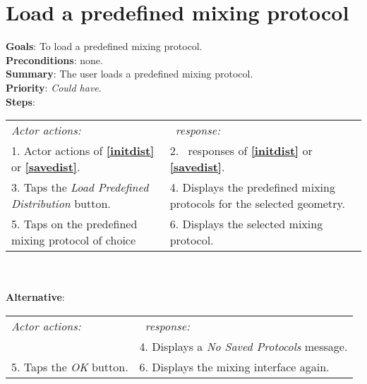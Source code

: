   \section{Load a predefined mixing protocol}
  \label{loadpredprot}
  \textbf{Goals}: To load a predefined mixing protocol.\\
  \textbf{Preconditions}: none.\\
  \textbf{Summary}: The user loads a predefined mixing protocol.\\
  \textbf{Priority}: \emph{Could have}.\\
  \textbf{Steps}: \\
  \begin{tabular}{ p{} p{} }
  	\emph{Actor actions:} & \emph{\projectname\ response:} \\
  	1. Actor actions of \textbf{\ref{initdist}} or  \textbf{\ref{savedist}}. & 2. \projectname\ responses of \textbf{\ref{initdist}} or  \textbf{\ref{savedist}}. \\
	3. Taps the \emph{Load Predefined Distribution} button. & 4. Displays the predefined mixing protocols for the selected geometry. \\
	5. Taps on the predefined mixing protocol of choice & 6. Displays the selected mixing protocol. \\
  \end{tabular}
  	 \\
     \\\textbf{Alternative}: \\
    \begin{tabular}{ p{} p{} }
  	\emph{Actor actions:} & \emph{\projectname\ response:} \\
            & 4. Displays a \emph{No Saved Protocols} message. \\
    5. Taps the \emph{OK} button. & 6. Displays the mixing interface again. \\
  \end{tabular}

